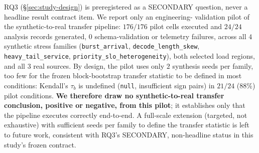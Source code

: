 RQ3 (\S\ref{sec:study-design}) is preregistered as a SECONDARY question,
never a headline result contract item. We report only an engineering-
validation pilot of the synthetic-to-real transfer pipeline: $176/176$
pilot cells executed and $24/24$ analysis records generated, $0$ schema-validation
or telemetry failures, across all $4$ synthetic stress families
(\texttt{burst\_arrival}, \texttt{decode\_length\_skew},
\texttt{heavy\_tail\_service}, \texttt{priority\_slo\_heterogeneity}), both
selected load regions, and all $3$ real sources. By design, the pilot uses
only $2$ synthesis seeds per family, too few for the frozen block-bootstrap
transfer statistic to be defined in most conditions: Kendall's $\tau_b$ is
undefined (\texttt{null}, insufficient sign pairs) in $21/24$ ($88\%$)
pilot conditions. \textbf{We therefore draw no synthetic-to-real transfer
conclusion, positive or negative, from this pilot}; it establishes only
that the pipeline executes correctly end-to-end. A full-scale extension
(targeted, not exhaustive) with sufficient seeds per family to define the
transfer statistic is left to future work, consistent with RQ3's
SECONDARY, non-headline status in this study's frozen contract.
